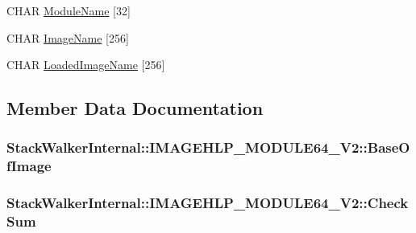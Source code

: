 \begin{DoxyCompactItemize}
\item 
C\-H\-A\-R \hyperlink{struct_stack_walker_internal_1_1_i_m_a_g_e_h_l_p___m_o_d_u_l_e64___v2_a79344486342eb5a61536dee516944530}{Module\-Name} \mbox{[}32\mbox{]}
\item 
C\-H\-A\-R \hyperlink{struct_stack_walker_internal_1_1_i_m_a_g_e_h_l_p___m_o_d_u_l_e64___v2_a83875c4ea0bc0f49ce001738d083f451}{Image\-Name} \mbox{[}256\mbox{]}
\item 
C\-H\-A\-R \hyperlink{struct_stack_walker_internal_1_1_i_m_a_g_e_h_l_p___m_o_d_u_l_e64___v2_a1b8c2fe1de8a7db46cc080aa43b7499d}{Loaded\-Image\-Name} \mbox{[}256\mbox{]}
\end{DoxyCompactItemize}


\subsection{Member Data Documentation}
\hypertarget{struct_stack_walker_internal_1_1_i_m_a_g_e_h_l_p___m_o_d_u_l_e64___v2_a60fc315622bd8c38e6cb3c265002afea}{
\subsubsection[{Base\-Of\-Image}]{ Stack\-Walker\-Internal\-::\-I\-M\-A\-G\-E\-H\-L\-P\-\_\-\-M\-O\-D\-U\-L\-E64\-\_\-\-V2\-::\-Base\-Of\-Image}}\label{struct_stack_walker_internal_1_1_i_m_a_g_e_h_l_p___m_o_d_u_l_e64___v2_a60fc315622bd8c38e6cb3c265002afea}
\hypertarget{struct_stack_walker_internal_1_1_i_m_a_g_e_h_l_p___m_o_d_u_l_e64___v2_af222cd1aa79f57fdffd665cfcab94292}{
\subsubsection[{Check\-Sum}]{ Stack\-Walker\-Internal\-::\-I\-M\-A\-G\-E\-H\-L\-P\-\_\-\-M\-O\-D\-U\-L\-E64\-\_\-\-V2\-::\-Check\-Sum}}\label{struct_stack_walker_internal_1_1_i_m_a_g_e_h_l_p___m_o_d_u_l_e64___v2_af222cd1aa79f57fdffd665cfcab94292}
